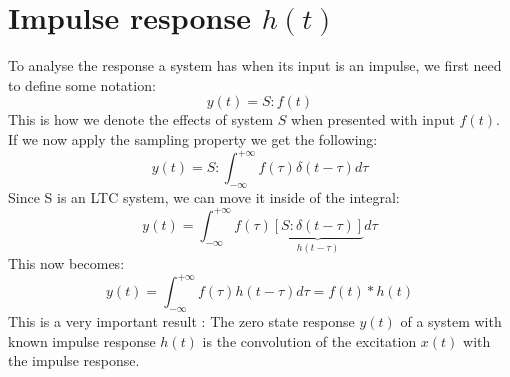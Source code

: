 \documentclass[]{subfiles}
\begin{document}
	\section{Impulse response $h(t)$}
	To analyse the response a system has when its input is an impulse, we first need to define some notation:
	\begin{equation}
		y(t) = S:f(t)
	\end{equation}
	This is how we denote the effects of  system $S$ when presented with input $f(t)$.   If we now apply the sampling property we get the following:
	\begin{equation}
		y(t)=S:\int_{-\infty}^{+\infty}f(\tau)\delta(t-\tau)d\tau
	\end{equation}
	Since S is an LTC system, we can move it inside of the integral:
	\begin{equation}
		y(t)=\int_{-\infty}^{+\infty}f(\tau)\underbrace{\left[ S:\delta(t-\tau)\right] }_{h(t-\tau)}d\tau
	\end{equation}
	This now becomes:
	\begin{equation}
		y(t)=\int_{-\infty}^{+\infty}f(\tau)h(t-\tau)d\tau=f(t)\ast h(t)
	\end{equation}
	This is a very important result : The zero  state  response  $y(t)$  of  a system  with  known  impulse  response $ h(t)$  is  the convolution of the excitation $x(t)$  with the impulse response. 
\end{document}
